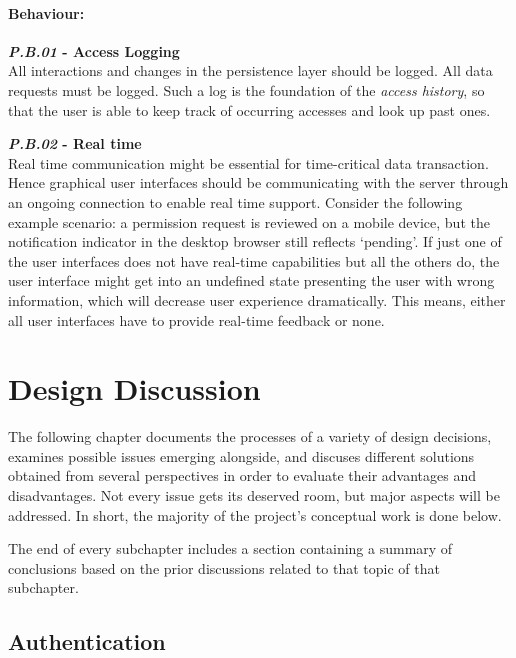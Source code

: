\documentclass[12pt,english,a4paper,titlepage,cleardoublepage=empty,dottedtoc]{report}
\begin{document}
\subsubsection*{Behaviour:}\label{behaviour}

\textbf{\emph{\protect\hypertarget{pb01}{}{P.B.01}} - Access Logging}\\
All interactions and changes in the persistence layer should be logged.
All data requests must be logged. Such a log is the foundation of the
\emph{access history}, so that the user is able to keep track of
occurring accesses and look up past ones.

\textbf{\emph{\protect\hypertarget{pb02}{}{P.B.02}} - Real time}\\
Real time communication might be essential for time-critical data
transaction. Hence graphical user interfaces should be communicating
with the server through an ongoing connection to enable real time
support. Consider the following example scenario: a permission request
is reviewed on a mobile device, but the notification indicator in the
desktop browser still reflects `pending'. If just one of the user
interfaces does not have real-time capabilities but all the others do,
the user interface might get into an undefined state presenting the user
with wrong information, which will decrease user experience
dramatically. This means, either all user interfaces have to provide
real-time feedback or none.

\hypertarget{design-discussion}{\chapter{Design
Discussion}\label{design-discussion}}

The following chapter documents the processes of a variety of design
decisions, examines possible issues emerging alongside, and discuses
different solutions obtained from several perspectives in order to
evaluate their advantages and disadvantages. Not every issue gets its
deserved room, but major aspects will be addressed. In short, the
majority of the project's conceptual work is done below.

The end of every subchapter includes a section containing a summary of
conclusions based on the prior discussions related to that topic of that
subchapter.

\hypertarget{authentication}{\section{Authentication}\label{authentication}}
\end{document}
